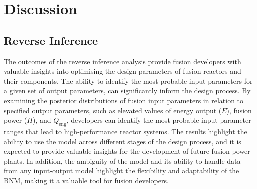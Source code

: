 \documentclass[journal]{IEEEtran}
\begin{document}


\section{Discussion}\label{sec:Discussion}


\subsection{Reverse Inference}\label{sec:disc_reverse}

The outcomes of the reverse inference analysis provide fusion developers with valuable insights into optimising the design parameters of fusion reactors and their components. The ability to identify the most probable input parameters for a given set of output parameters, can significantly inform the design process. By examining the posterior distributions of fusion input parameters in relation to specified output parameters, such as elevated values of energy output ($E$), fusion power ($H$), and $Q_{\text{eng}}$, developers can identify the most probable input parameter ranges that lead to high-performance reactor systems. The results highlight the ability to use the model across different stages of the design process, and it is expected to provide valuable insights for the development of future fusion power plants. In addition, the ambiguity of the model and its ability to handle data from any input-output model highlight the flexibility and adaptability of the BNM, making it a valuable tool for fusion developers.
\end{document}
